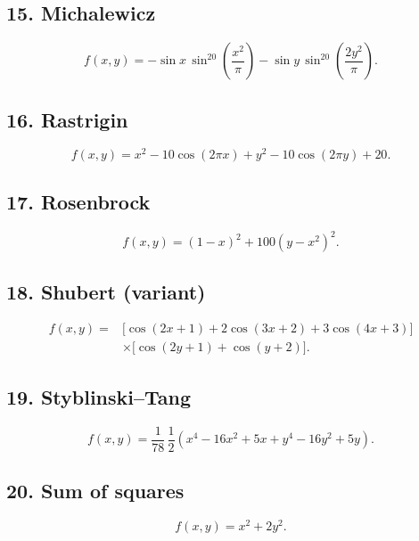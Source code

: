 \subsection*{15. Michalewicz}
\begin{equation}\label{eq:supp-michalewicz}
f(x,y)=-\sin x\,\sin^{20}\!\left(\frac{x^2}{\pi}\right)
-\sin y\,\sin^{20}\!\left(\frac{2y^2}{\pi}\right).
\end{equation}

\subsection*{16. Rastrigin}
\begin{equation}\label{eq:supp-rastrigin}
f(x,y)=x^2-10\cos(2\pi x)+y^2-10\cos(2\pi y)+20.
\end{equation}

\subsection*{17. Rosenbrock}
\begin{equation}\label{eq:supp-rosenbrock}
f(x,y)=(1-x)^2+100(y-x^2)^2.
\end{equation}

\subsection*{18. Shubert (variant)}
\begin{equation}\label{eq:supp-shubert}
\begin{aligned}
f(x,y)={}&\bigl[\cos(2x+1)+2\cos(3x+2)+3\cos(4x+3)\bigr]\\
&\times\bigl[\cos(2y+1)+\cos(y+2)\bigr].
\end{aligned}
\end{equation}

\FloatBarrier %
\subsection*{19. Styblinski--Tang}
\begin{equation}\label{eq:supp-styblinski}
f(x,y)=\frac{1}{78}\,\frac12
\left(x^4-16x^2+5x+y^4-16y^2+5y\right).
\end{equation}

\subsection*{20. Sum of squares}
\begin{equation}\label{eq:supp-squares}
f(x,y)=x^2+2y^2.
\end{equation}

